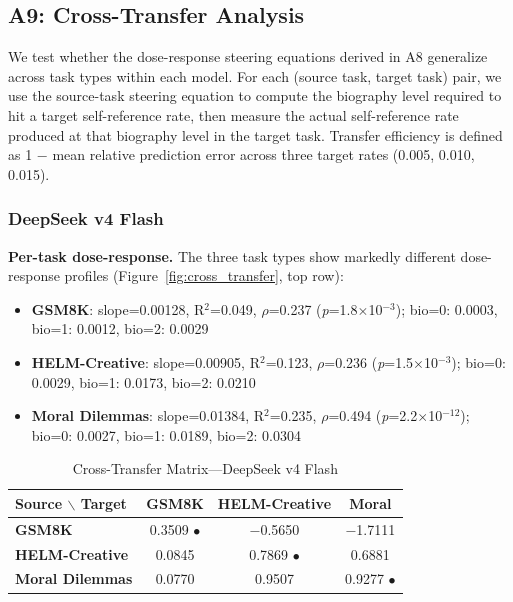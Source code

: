 \documentclass[11pt,a4paper]{article}
\begin{document}
\subsection{A9: Cross-Transfer Analysis}
\label{sec:a9}

We test whether the dose-response steering equations derived in A8 generalize across task types within each model. For each (source task, target task) pair, we use the source-task steering equation to compute the biography level required to hit a target self-reference rate, then measure the actual self-reference rate produced at that biography level in the target task. Transfer efficiency is defined as 1 $-$ mean relative prediction error across three target rates (0.005, 0.010, 0.015).

\subsubsection{DeepSeek v4 Flash}

\textbf{Per-task dose-response.} The three task types show markedly different dose-response profiles (Figure~\ref{fig:cross_transfer}, top row):
\begin{itemize}[nosep]
\item \textbf{GSM8K}: slope=0.00128, R$^2$=0.049, $\rho$=0.237 (\textit{p}=1.8$\times$10$^{-3}$); bio=0: 0.0003, bio=1: 0.0012, bio=2: 0.0029
\item \textbf{HELM-Creative}: slope=0.00905, R$^2$=0.123, $\rho$=0.236 (\textit{p}=1.5$\times$10$^{-3}$); bio=0: 0.0029, bio=1: 0.0173, bio=2: 0.0210
\item \textbf{Moral Dilemmas}: slope=0.01384, R$^2$=0.235, $\rho$=0.494 (\textit{p}=2.2$\times$10$^{-12}$); bio=0: 0.0027, bio=1: 0.0189, bio=2: 0.0304
\end{itemize}

\begin{table}[H]
\centering
\caption{Cross-Transfer Matrix---DeepSeek v4 Flash}
\label{tab:ct_deepseek}
\begin{tabular}{lccc}
\toprule
\textbf{Source $\backslash$ Target} & \textbf{GSM8K} & \textbf{HELM-Creative} & \textbf{Moral} \\
\midrule
\textbf{GSM8K} & 0.3509 $\bullet$ & $-$0.5650 & $-$1.7111 \\
\textbf{HELM-Creative} & 0.0845 & 0.7869 $\bullet$ & 0.6881 \\
\textbf{Moral Dilemmas} & 0.0770 & 0.9507 & 0.9277 $\bullet$ \\
\bottomrule
\end{tabular}
\end{table}
\end{document}
